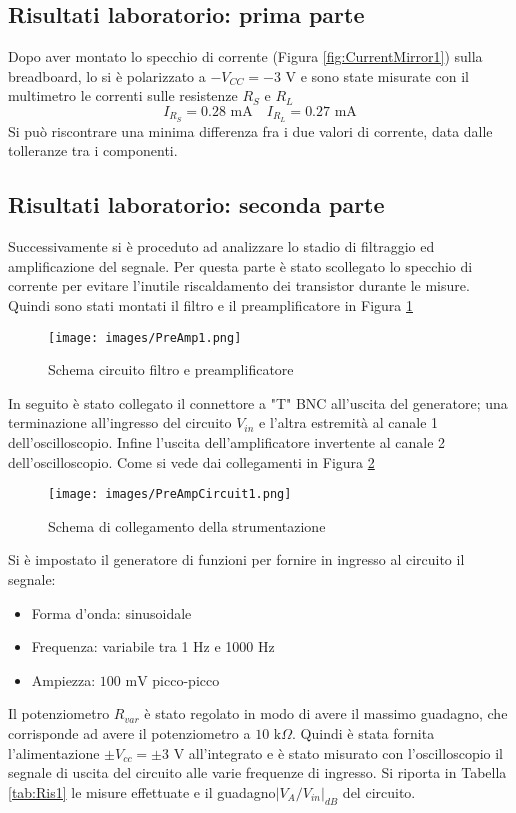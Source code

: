 \subsection{Risultati laboratorio: prima parte}
Dopo aver montato lo specchio di corrente (Figura \ref{fig:CurrentMirror1}) sulla breadboard, lo si è polarizzato a $-V_{CC}=-3\text{ V}$ e sono state misurate con il multimetro le correnti sulle resistenze $R_S$ e $R_L$
\begin{equation*}
    I_{R_S}=0.28\text{ mA}\quad I_{R_L}=0.27\text{ mA}
\end{equation*}
Si può riscontrare una minima differenza fra i due valori di corrente, data dalle tolleranze tra i componenti.
\clearpage
\subsection{Risultati laboratorio: seconda parte}
Successivamente si è proceduto ad analizzare lo stadio di filtraggio ed amplificazione del segnale. Per questa parte è stato scollegato lo specchio di corrente per evitare l'inutile riscaldamento dei transistor durante le misure. Quindi sono stati montati il filtro e il preamplificatore in Figura \ref{fig:PreAmp1}
\begin{figure}[H]
    \centering
    \texttt{[image: images/PreAmp1.png]}
    \caption{Schema circuito filtro e preamplificatore}
    \label{fig:PreAmp1}
\end{figure}
In seguito è stato collegato il connettore a "T" BNC all'uscita del generatore; una terminazione all'ingresso del circuito  $V_{in}$ e l'altra estremità al canale 1 dell'oscilloscopio. Infine l'uscita dell'amplificatore invertente al canale 2 dell'oscilloscopio. Come si vede dai collegamenti in Figura \ref{fig:PreAmpCircuit1}
\begin{figure}[H]
    \centering
    \texttt{[image: images/PreAmpCircuit1.png]}
    \caption{Schema di collegamento della strumentazione}
    \label{fig:PreAmpCircuit1}
\end{figure}
\noindent Si è impostato il generatore di funzioni per fornire in ingresso al circuito il segnale:
\begin{itemize}
    \item Forma d'onda: sinusoidale
    \item Frequenza: variabile tra 1 Hz e 1000 Hz
    \item Ampiezza: $100\text{ mV}$ picco-picco
\end{itemize}
Il potenziometro $R_{var}$ è stato regolato in modo di avere il massimo guadagno, che corrisponde ad avere il potenziometro a $10\text{ k}\Omega$. Quindi è stata fornita l'alimentazione $\pm V_{cc}=\pm3\text{ V}$ all'integrato e è stato misurato con l'oscilloscopio il segnale di uscita del circuito alle varie frequenze di ingresso. Si riporta in Tabella \ref{tab:Ris1} le misure effettuate e il guadagno$\left|V_A/V_{in}\right|_{dB}$ del circuito.
